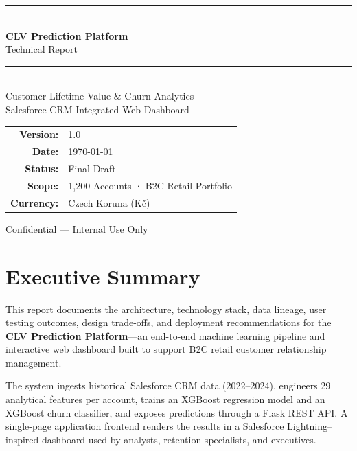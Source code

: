 \documentclass[11pt,a4paper]{article}
\begin{document}
\begin{titlepage}
  \centering
  \vspace*{2cm}
  {\color{sfnavy}\rule{\linewidth}{1.2pt}}\\[0.6em]
  {\Huge\bfseries\color{sfnavy} CLV Prediction Platform}\\[0.4em]
  {\Large\color{sfblue} Technical Report}\\[0.3em]
  {\color{sfnavy}\rule{\linewidth}{1.2pt}}\\[1.2em]
  {\large Customer Lifetime Value \& Churn Analytics}\\[0.2em]
  {\large Salesforce CRM-Integrated Web Dashboard}\\[2cm]
  \begin{tabular}{rl}
    \textbf{Version:}   & 1.0 \\[3pt]
    \textbf{Date:}      & \today \\[3pt]
    \textbf{Status:}    & Final Draft \\[3pt]
    \textbf{Scope:}     & 1{,}200 Accounts · B2C Retail Portfolio \\[3pt]
    \textbf{Currency:}  & Czech Koruna (Kč) \\
  \end{tabular}
  \vfill
  {\small\color{sfgray} Confidential — Internal Use Only}
\end{titlepage}

\tableofcontents
\newpage

\section{Executive Summary}

This report documents the architecture, technology stack, data lineage, user testing
outcomes, design trade-offs, and deployment recommendations for the
\textbf{CLV Prediction Platform}—an end-to-end machine learning pipeline and
interactive web dashboard built to support B2C retail customer relationship
management.

The system ingests historical Salesforce CRM data (2022--2024), engineers 29
analytical features per account, trains an XGBoost regression model and an
XGBoost churn classifier, and exposes predictions through a Flask REST API.
A single-page application frontend renders the results in a Salesforce Lightning–
inspired dashboard used by analysts, retention specialists, and executives.
\end{document}
